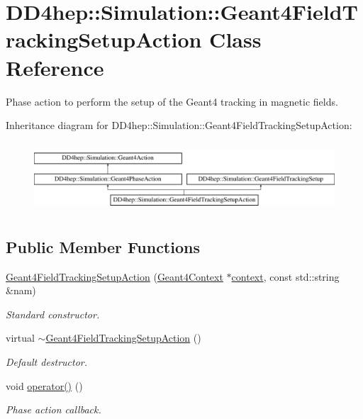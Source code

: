 \hypertarget{class_d_d4hep_1_1_simulation_1_1_geant4_field_tracking_setup_action}{}\section{D\+D4hep\+:\+:Simulation\+:\+:Geant4\+Field\+Tracking\+Setup\+Action Class Reference}
\label{class_d_d4hep_1_1_simulation_1_1_geant4_field_tracking_setup_action}


Phase action to perform the setup of the Geant4 tracking in magnetic fields.  


Inheritance diagram for D\+D4hep\+:\+:Simulation\+:\+:Geant4\+Field\+Tracking\+Setup\+Action\+:\begin{figure}[H]
\begin{center}
\leavevmode
\includegraphics[height=2.625000cm]{class_d_d4hep_1_1_simulation_1_1_geant4_field_tracking_setup_action}
\end{center}
\end{figure}
\subsection*{Public Member Functions}
\begin{DoxyCompactItemize}
\item 
\hyperlink{class_d_d4hep_1_1_simulation_1_1_geant4_field_tracking_setup_action_a921208adb94ef397bd208a75a8654dcc}{Geant4\+Field\+Tracking\+Setup\+Action} (\hyperlink{class_d_d4hep_1_1_simulation_1_1_geant4_context}{Geant4\+Context} $\ast$\hyperlink{class_d_d4hep_1_1_simulation_1_1_geant4_action_aa9d87f0ec2a72b7fc2591b18f98d75cf}{context}, const std\+::string \&nam)
\begin{DoxyCompactList}\small\item\em Standard constructor. \end{DoxyCompactList}\item 
virtual \hyperlink{class_d_d4hep_1_1_simulation_1_1_geant4_field_tracking_setup_action_aec9b4efefc6cce22342b63fd91a5ef8b}{$\sim$\+Geant4\+Field\+Tracking\+Setup\+Action} ()
\begin{DoxyCompactList}\small\item\em Default destructor. \end{DoxyCompactList}\item 
void \hyperlink{class_d_d4hep_1_1_simulation_1_1_geant4_field_tracking_setup_action_a5412b262d35a196e35807b2a3fe2463b}{operator()} ()
\begin{DoxyCompactList}\small\item\em Phase action callback. \end{DoxyCompactList}\end{DoxyCompactItemize}
